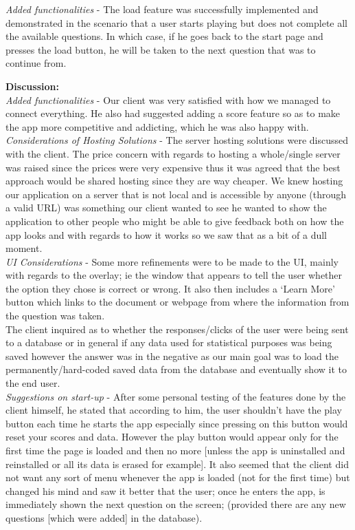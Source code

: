 \documentclass[paper=a4,fontsize=11pt]{article}
\newcommand{\sepspace}{\vspace*{1em}}		%
\begin{document}
\noindent
\textit{Added functionalities} -
The load feature was successfully implemented and demonstrated in the scenario that a user
starts playing but does not complete all the available questions. In which case, if he goes back
to the start page and presses the load button, he will be taken to the next question that was to
continue from.\\
\sepspace

\noindent
\textbf{Discussion:}\\
\noindent
\textit{Added functionalities} -
Our client was very satisfied with how we managed to connect everything. He also had
suggested adding a score feature so as to make the app more competitive and addicting,
which he was also happy with.\\

\noindent
\textit{Considerations of Hosting Solutions} -
The server hosting solutions were discussed with the client. The price concern with regards to
hosting a whole/single server was raised since the prices were very expensive thus it was
agreed that the best approach would be shared hosting since they are way cheaper. We knew
hosting our application on a server that is not local and is accessible by anyone (through a
valid URL) was something our client wanted to see he wanted to show the application to
other people who might be able to give feedback both on how the app looks and with regards
to how it works so we saw that as a bit of a dull moment.\\

\noindent
\textit{UI Considerations} -
Some more refinements were to be made to the UI, mainly with regards to the overlay; ie the
window that appears to tell the user whether the option they chose is correct or wrong. It also
then includes a ‘Learn More’ button which links to the document or webpage from where the
information from the question was taken.\\
\noindent
The client inquired as to whether the responses/clicks of the user were being sent to a
database or in general if any data used for statistical purposes was being saved however the
answer was in the negative as our main goal was to load the permanently/hard-coded saved
data from the database and eventually show it to the end user.\\

\noindent
\textit{Suggestions on start-up} -
After some personal testing of the features done by the client himself, he stated that according
to him, the user shouldn’t have the play button each time he starts the app especially since
pressing on this button would reset your scores and data. However the play button would
appear only for the first time the page is loaded and then no more [unless the app is
uninstalled and reinstalled or all its data is erased for example]. It also seemed that the client
did not want any sort of menu whenever the app is loaded (not for the first time) but changed
his mind and saw it better that the user; once he enters the app, is immediately shown the next
question on the screen; (provided there are any new questions [which were added] in the
database).\\
\end{document}
